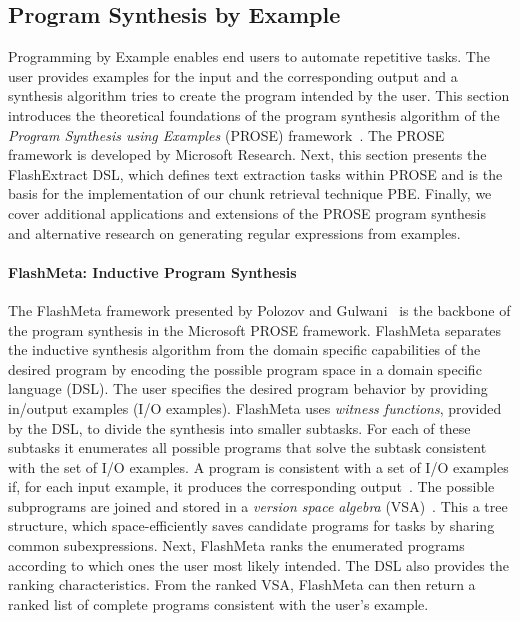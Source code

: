 \documentclass[\myrootdir/main.tex]{subfiles}
\begin{document}

\subsection{Program Synthesis by Example}
\label{sec:rw-prose}
Programming by Example enables end users to automate repetitive tasks.
The user provides examples for the input and the corresponding output and a synthesis algorithm tries to create the program intended by the user.
This section introduces the theoretical foundations of the program synthesis algorithm of the \emph{Program Synthesis using Examples} (PROSE) framework~\cite{prose2019webpage}.
The PROSE framework is developed by Microsoft Research.
Next, this section presents the FlashExtract DSL, which defines text extraction tasks within PROSE and is the basis for the implementation of our chunk retrieval technique PBE\@.
Finally, we cover additional applications and extensions of the PROSE program synthesis and alternative research on generating regular expressions from examples.

\paragraph{FlashMeta: Inductive Program Synthesis}
The FlashMeta framework presented by Polozov and Gulwani~\cite{polozov2015flashmeta:} is the backbone of the program synthesis in the Microsoft PROSE framework.
FlashMeta separates the inductive synthesis algorithm from the domain specific capabilities of the desired program by encoding the possible program space in a domain specific language (DSL).
The user specifies the desired program behavior by providing in/output examples (I/O examples).
FlashMeta uses \emph{witness functions}, provided by the DSL, to divide the synthesis into smaller subtasks.
For each of these subtasks it enumerates all possible programs that solve the subtask consistent with the set of I/O examples.
A program is consistent with a set of I/O examples if, for each input example, it produces the corresponding output~\cite{mitchell1982generalization}.
The possible subprograms are joined and stored in a \emph{version space algebra} (VSA)~\cite{mitchell1982generalization}.
This a tree structure, which space-efficiently saves candidate programs for tasks by sharing common subexpressions.
Next, FlashMeta ranks the enumerated programs according to which ones the user most likely intended.
The DSL also provides the ranking characteristics.
From the ranked VSA, FlashMeta can then return a ranked list of complete programs consistent with the user's example.
\end{document}
